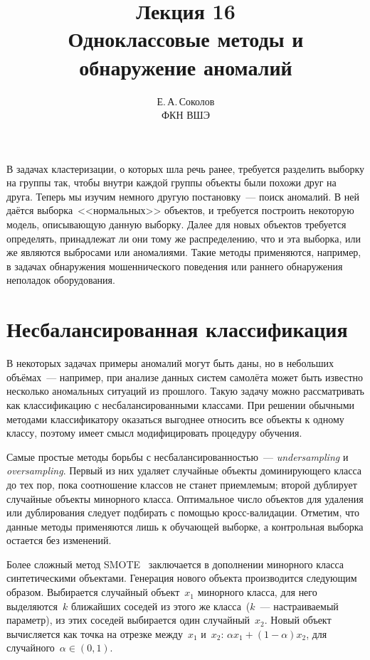 \documentclass[12pt,fleqn]{article}
\begin{document}
\title{Лекция 16\\Одноклассовые методы и обнаружение аномалий}
\author{Е.\,А.\,Соколов\\ФКН ВШЭ}
\maketitle

В задачах кластеризации, о которых шла речь ранее, требуется разделить выборку
на группы так, чтобы внутри каждой группы объекты были похожи друг на друга.
Теперь мы изучим немного другую постановку~--- поиск аномалий.
В ней даётся выборка~<<нормальных>> объектов, и требуется построить некоторую модель,
описывающую данную выборку.
Далее для новых объектов требуется определять, принадлежат ли они тому же распределению,
что и эта выборка, или же являются выбросами или аномалиями.
Такие методы применяются, например, в задачах обнаружения мошеннического поведения
или раннего обнаружения неполадок оборудования.

\section{Несбалансированная классификация}

В некоторых задачах примеры аномалий могут быть даны, но в небольших объёмах~---
например, при анализе данных систем самолёта может быть
известно несколько аномальных ситуаций из прошлого.
Такую задачу можно рассматривать как классификацию с несбалансированными классами.
При решении обычными методами классификатору оказаться выгоднее относить все объекты к одному классу,
поэтому имеет смысл модифицировать процедуру обучения.

Самые простые методы борьбы с несбалансированностью~--- \emph{undersampling} и \emph{oversampling}.
Первый из них удаляет случайные объекты доминирующего класса до тех пор,
пока соотношение классов не станет приемлемым;
второй дублирует случайные объекты минорного класса.
Оптимальное число объектов для удаления или дублирования следует подбирать с помощью кросс-валидации.
Отметим, что данные методы применяются лишь к обучающей выборке,
а контрольная выборка остается без изменений.

Более сложный метод SMOTE~\cite{chawla02smote} заключается в дополнении минорного класса
синтетическими объектами.
Генерация нового объекта производится следующим образом.
Выбирается случайный объект~$x_1$ минорного класса, для него выделяются~$k$ ближайших
соседей из этого же класса~($k$~--- настраиваемый параметр), из этих соседей
выбирается один случайный~$x_2$.
Новый объект вычисляется как точка на отрезке между~$x_1$ и~$x_2$:
$\alpha x_1 + (1 - \alpha) x_2$, для случайного~$\alpha \in (0, 1)$.
\end{document}
